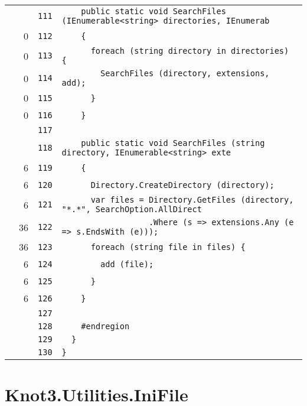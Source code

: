 \documentclass[a4paper,10pt]{article}
\begin{document}
\begin{longtable}[l]{lrrl}
\cellcolor{gray} &  & \verb~111~ & \verb~    public static void SearchFiles (IEnumerable<string> directories, IEnumerab~\\
\cellcolor{red} & 0 & \verb~112~ & \verb~    {~\\
\cellcolor{red} & 0 & \verb~113~ & \verb~      foreach (string directory in directories) {~\\
\cellcolor{red} & 0 & \verb~114~ & \verb~        SearchFiles (directory, extensions, add);~\\
\cellcolor{red} & 0 & \verb~115~ & \verb~      }~\\
\cellcolor{red} & 0 & \verb~116~ & \verb~    }~\\
\cellcolor{gray} &  & \verb~117~ & \verb~~\\
\cellcolor{gray} &  & \verb~118~ & \verb~    public static void SearchFiles (string directory, IEnumerable<string> exte~\\
\cellcolor{green} & 6 & \verb~119~ & \verb~    {~\\
\cellcolor{green} & 6 & \verb~120~ & \verb~      Directory.CreateDirectory (directory);~\\
\cellcolor{green} & 6 & \verb~121~ & \verb~      var files = Directory.GetFiles (directory, "*.*", SearchOption.AllDirect~\\
\cellcolor{green} & 36 & \verb~122~ & \verb~                  .Where (s => extensions.Any (e => s.EndsWith (e)));~\\
\cellcolor{green} & 36 & \verb~123~ & \verb~      foreach (string file in files) {~\\
\cellcolor{green} & 6 & \verb~124~ & \verb~        add (file);~\\
\cellcolor{green} & 6 & \verb~125~ & \verb~      }~\\
\cellcolor{green} & 6 & \verb~126~ & \verb~    }~\\
\cellcolor{gray} &  & \verb~127~ & \verb~~\\
\cellcolor{gray} &  & \verb~128~ & \verb~    #endregion~\\
\cellcolor{gray} &  & \verb~129~ & \verb~  }~\\
\cellcolor{gray} &  & \verb~130~ & \verb~}~\\
\end{longtable}
\newpage
\section{Knot3.Utilities.IniFile}
\end{document}
